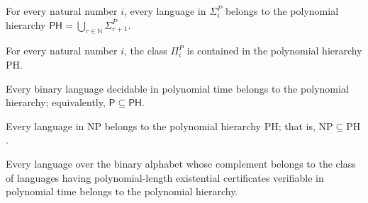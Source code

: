 \begin{theorem}
\label{Complexity.SigmaP_subset_PH}
\leanok
{}
For every natural number $i$, every language in $\Sigma_i^P$ belongs to the polynomial
hierarchy $\mathsf{PH}=\bigcup_{r\in\mathbb{N}}\Sigma_{r+1}^P$.
\end{theorem}

\begin{theorem}
\label{Complexity.PiP_subset_PH}
\leanok
{}
For every natural number $i$, the class $\Pi_i^P$ is contained in the polynomial
hierarchy $\mathrm{PH}$.
\end{theorem}

\begin{theorem}
\label{Complexity.P_subset_PH}
\leanok
{}
Every binary language decidable in polynomial time belongs to the polynomial hierarchy;
equivalently, $\mathsf{P} \subseteq \mathsf{PH}$.
\end{theorem}

\begin{theorem}
\label{Complexity.NP_subset_PH}
\leanok
{}
Every language in $\mathrm{NP}$ belongs to the polynomial hierarchy $\mathrm{PH}$; that
is, $\mathrm{NP}\subseteq\mathrm{PH}$.
\end{theorem}

\begin{theorem}
\label{Complexity.coNP_subset_PH}
\leanok
{}
Every language over the binary alphabet whose complement belongs to the class of
languages having polynomial-length existential certificates verifiable in polynomial
time belongs to the polynomial hierarchy.
\end{theorem}

